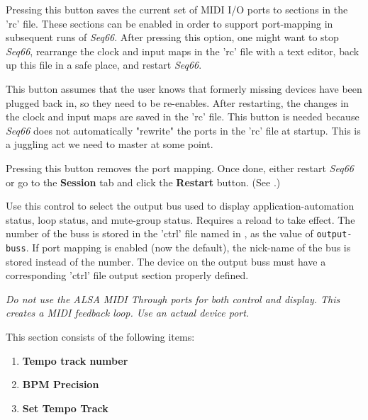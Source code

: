    Pressing this button saves the current set of MIDI I/O ports to sections in
   the 'rc' file.  These sections can be enabled in order to support
   port-mapping in subsequent runs of \textsl{Seq66}.
   After pressing this option, one might want to stop
   \textsl{Seq66}, rearrange the clock and input maps in the
   'rc' file with a text editor, back up this file in a safe place,
   and restart \textsl{Seq66}.

   This button assumes that the user knows that formerly missing
   devices have been plugged back in, so they need to be
   re-enables. After restarting, the changes in the clock and input maps
   are saved in the 'rc' file.
   This button is needed because \textsl{Seq66} does not
   automatically "rewrite" the ports in the 'rc' file at startup.
   This is a juggling act we need to master at some point.

   Pressing this button removes the port mapping.
   Once done, either restart \textsl{Seq66} or go to the \textbf{Session}
   tab and click the \textbf{Restart} button.
   (See .)

   Use this control to select the output bus used to display
   application-automation status, loop status, and mute-group status.
   Requires a reload to take effect.
   The number of the buss is stored in the 'ctrl' file named in
   ,
   as the value of \texttt{output-buss}.
   If port mapping is enabled (now the default),
   the nick-name of the bus is stored instead of the number.
   The device on the output buss must have a corresponding
   'ctrl' file output section properly defined.

   \textsl{Do not use the ALSA MIDI Through ports for both control
   and display. This creates a MIDI feedback loop.
   Use an actual device port.}

   This section consists of the following items:

   \begin{enumerate}
      \item \textbf{Tempo track number}
      \item \textbf{BPM Precision}
      \item \textbf{Set Tempo Track}
   \end{enumerate}

